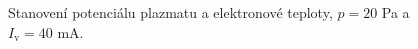 \documentclass[a4paper,12pt]{article}
\begin{document}
\begin{figure}[h]
	\centering
	\begin{subfigure}[b]{.49\textwidth}
		\centering
	\end{subfigure}
	\begin{subfigure}[b]{.49\textwidth}
		\centering
	\end{subfigure}
	\caption{Stanovení potenciálu plazmatu a elektronové teploty, $p = 20$ \si{\pascal} a $I_\text{v} = 40$ \si{\milli\ampere}.}
	\label{data5}
\end{figure}
\end{document}
